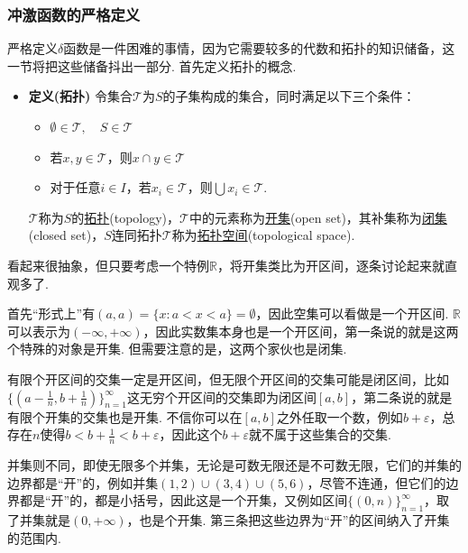 \subsubsection{冲激函数的严格定义}

严格定义\(\delta\)函数是一件困难的事情，因为它需要较多的代数和拓扑的知识储备，这一节将把这些储备抖出一部分. 首先定义拓扑的概念.

\begin{itemize}
    \item[\(\bullet\)] \textbf{定义(拓扑)}
    \newline
    令集合\(\mathcal{T}\)为\(S\)的子集构成的集合，同时满足以下三个条件：
    \begin{itemize}
        \item [(1)] \(\emptyset \in \mathcal{T}, \quad S \in \mathcal{T}\)
        \item [(2)] 若\(x,y \in \mathcal{T}\)，则\(x \cap y \in \mathcal{T}\)
        \item [(3)] 对于任意\(i \in I\)，若\(x_i \in \mathcal{T}\)，则\(\bigcup x_i \in \mathcal{T}\).
    \end{itemize}
    \(\mathcal{T}\)称为\(S\)的\uline{拓扑}(topology)，\(\mathcal{T}\)中的元素称为\uline{开集}(open set)，其补集称为\uline{闭集}(closed set)，\(S\)连同拓扑\(\mathcal{T}\)称为\uline{拓扑空间}(topological space).
\end{itemize}

看起来很抽象，但只要考虑一个特例\(\mathbb{R}\)，将开集类比为开区间，逐条讨论起来就直观多了. 

首先“形式上”有\((a,a)=\{x: a<x<a\}=\emptyset\)，因此空集可以看做是一个开区间. \(\mathbb{R}\)可以表示为\((-\infty,+\infty)\)，因此实数集本身也是一个开区间，第一条说的就是这两个特殊的对象是开集. 但需要注意的是，这两个家伙也是闭集.

有限个开区间的交集一定是开区间，但无限个开区间的交集可能是闭区间，比如\(\{(a-\frac{1}{n}, b+\frac{1}{n})\}_{n=1}^{\infty}\)这无穷个开区间的交集即为闭区间\([a,b]\)，第二条说的就是有限个开集的交集也是开集. 不信你可以在\([a,b]\)之外任取一个数，例如\(b+\varepsilon\)，总存在\(n\)使得\(b<b+\frac{1}{n}<b+\varepsilon\)，因此这个\(b+\varepsilon\)就不属于这些集合的交集.

并集则不同，即使无限多个并集，无论是可数无限还是不可数无限，它们的并集的边界都是“开”的，例如并集\((1,2)\cup(3,4)\cup(5,6)\)，尽管不连通，但它们的边界都是“开”的，都是小括号，因此这是一个开集，又例如区间\(\{(0,n)\}_{n=1}^{\infty}\)，取了并集就是\((0,+\infty)\)，也是个开集. 第三条把这些边界为“开”的区间纳入了开集的范围内.

